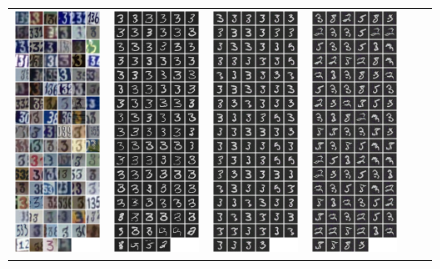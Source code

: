 \documentclass{article} %
\begin{document}
 \begin{figure}[H]
 \centering
 \begin{tabular}{c@{~}c@{~}c@{~}c@{~}c@{~}c}
 \includegraphics[width=0.1597\linewidth]{3_orig_sorted_by_vanilla.png}&
 \includegraphics[width=0.1597\linewidth]{3_vanilla_sorted.png}&
\includegraphics[width=0.1597\linewidth]{3_no_adaptation_in_s_sorted_by_vanilla.png}&
 \includegraphics[width=0.1597\linewidth]{3_no_adaptation_in_t_sorted_by_vanilla.png}&

\end{tabular}
\end{figure}
\end{document}
